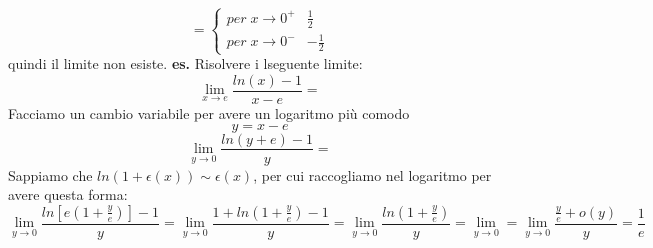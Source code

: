 \[
    = \begin{cases}
        per \; x \rightarrow 0^+ & \frac{1}{2} \\
        per \; x \rightarrow 0^- & -\frac{1}{2}
    \end{cases}
\]
quindi il limite non esiste.
\newline
\newline
\newline
\textbf{es.} Risolvere i lseguente limite:
\[
    \lim_{x\rightarrow e} \frac{ln(x)-1}{x-e} =
\]
Facciamo un cambio variabile per avere un logaritmo più comodo
\[
    y = x-e
\]
\[
    \lim_{y\rightarrow 0} \frac{ln(y+e)-1}{y} = 
\]
Sappiamo che $ln(1+\epsilon(x)) \sim  \epsilon(x)$, per cui raccogliamo nel logaritmo per avere questa forma:
\[
    \lim_{y\rightarrow 0} \frac{ln[e(1+\frac{y}{e})]-1}{y} = \lim_{y\rightarrow 0}  \frac{1 + ln ( 1 + \frac{y}{e})-1}{y} = \lim_{y\rightarrow 0} \frac{ln ( 1 + \frac{y}{e})}{y} = \lim_{y\rightarrow 0} = \lim_{y\rightarrow 0} \frac{\frac{y}{e} + o(y)}{y} = \frac{1}{e}
\]

\newpage